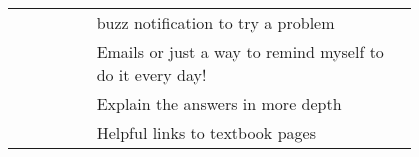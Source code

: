 {\begin{longtable}{R|p{0.8\linewidth}}
		& buzz notification to try a problem                                                                                                                                                                                                                                                                                                                                                                                                                                                                                                                                                                                                                                                                                                               \\
		& Emails or just a way to remind myself to do it every day!                                                                                                                                                                                                                                                                                                                                                                                                                                                                                                                                                                                                                                                                                        \\
		& Explain the answers in more depth                                                                                                                                                                                                                                                                                                                                                                                                                                                                                                                                                                                                                                                                                                                \\
		& Helpful links to textbook pages                                                                                                                                                                                                                                                                                                                                                                                                                                                                                                                                                                                                                                                                                                                  \\

\end{longtable}}
